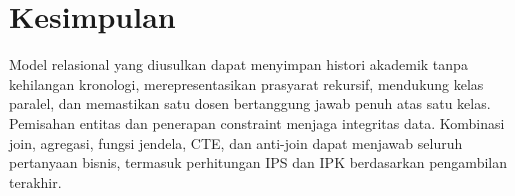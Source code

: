 \section{Kesimpulan}

Model relasional yang diusulkan dapat menyimpan histori akademik tanpa kehilangan kronologi, merepresentasikan prasyarat rekursif, mendukung kelas paralel, dan memastikan satu dosen bertanggung jawab penuh atas satu kelas. Pemisahan entitas dan penerapan constraint menjaga integritas data. Kombinasi join, agregasi, fungsi jendela, CTE, dan anti-join dapat menjawab seluruh pertanyaan bisnis, termasuk perhitungan IPS dan IPK berdasarkan pengambilan terakhir.
